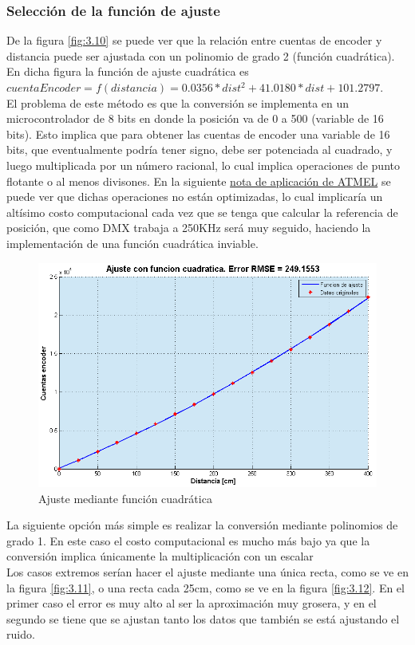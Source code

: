 \subsubsection{Selección de la función de ajuste}
De la figura \ref{fig:3.10} se puede ver que la relación entre cuentas de encoder y distancia puede ser ajustada con un polinomio de grado 2 (función cuadrática). En dicha figura la función de ajuste cuadrática es \(cuentaEncoder = f(distancia) = 0.0356*dist^2 + 41.0180*dist + 101.2797\).\\     
El problema de este método es que la conversión se implementa en un microcontrolador de 8 bits en donde la posición va de 0 a 500 (variable de 16 bits). Esto implica que para obtener las cuentas de encoder una variable de 16 bits, que eventualmente podría tener signo, debe ser potenciada al cuadrado, y luego multiplicada por un número racional, lo cual implica operaciones de punto flotante o al menos divisones. En la siguiente \href{http://www.atmel.com/Images/doc0936.pdf}{nota de aplicación de ATMEL} se puede ver que dichas operaciones no están optimizadas, lo cual implicaría un altísimo costo computacional cada vez que se tenga que calcular la referencia de posición, que como DMX trabaja a 250KHz será muy seguido, haciendo la implementación de una función cuadrática inviable. \\

\begin{figure}[!ht]
	\centering
	\includegraphics[width=15cm,scale=1]{resources/3_10-ajusteCuadratico.png}
	\caption{Ajuste mediante función cuadrática}
	\label{fig:\thefigure}
\end{figure}

La siguiente opción más simple es realizar la conversión mediante polinomios de grado 1. En este caso el costo computacional es mucho más bajo ya que la conversión implica únicamente la multiplicación con un escalar \\
Los casos extremos serían hacer el ajuste mediante una única recta, como se ve en la figura \ref{fig:3.11}, o una recta cada 25cm, como se ve en la figura \ref{fig:3.12}. En el primer caso el error es muy alto al ser la aproximación muy grosera, y en el segundo se tiene que se ajustan tanto los datos que también se está ajustando el ruido. \\

